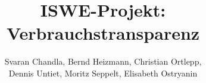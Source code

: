 \documentclass{article}
\begin{document}
\title{ISWE-Projekt: Verbrauchstransparenz}
\author{Svaran Chandla, Bernd Heizmann, Christian Ortlepp,\\ Dennis Untiet, Moritz Seppelt, Elisabeth Ostryanin}
\maketitle   
\tableofcontents
\newpage






\end{document}
